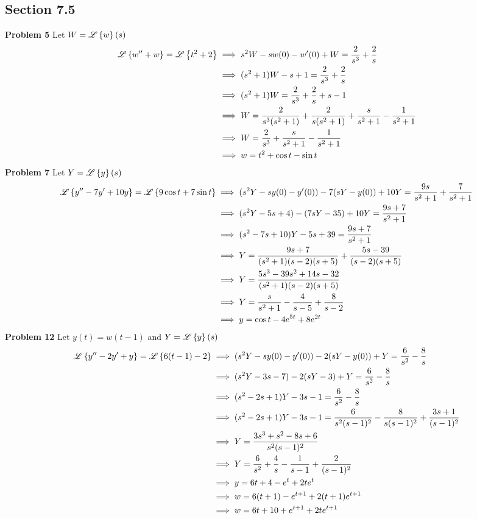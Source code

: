 \subsection*{Section 7.5}
\textbf{Problem 5}
Let $W = \mathscr{L} \left\{ w \right\}(s)$
\begin{align*}
    \mathscr{L} \left\{ w'' + w \right\} = \mathscr{L} \left\{ t^2+2 \right\}
    &\implies s^2W - sw(0) - w'(0) + W = \frac{2}{s^3} + \frac{2}{s} \\
    &\implies (s^2 + 1)W - s + 1 = \frac{2}{s^3} + \frac{2}{s} \\
    &\implies (s^2 + 1)W = \frac{2}{s^3} + \frac{2}{s} + s - 1 \\
    &\implies W = \frac{2}{s^3(s^2+1)} + \frac{2}{s(s^2+1)} + \frac{s}{s^2+1} - \frac{1}{s^2+1} \\
    &\implies W = \frac{2}{s^3} + \frac{s}{s^2+1} - \frac{1}{s^2+1} \\
    &\implies w = t^2 + \cos t - \sin t
\end{align*}
\textbf{Problem 7}
Let $Y = \mathscr{L} \left\{ y \right\}(s)$
\begin{align*}
    \mathscr{L} \left\{ y'' - 7y' + 10y \right\} = \mathscr{L} \left\{ 9\cos t + 7\sin t \right\}
    &\implies (s^2Y - sy(0) - y'(0))- 7 (sY - y(0)) + 10 Y = \frac{9s}{s^2+1} + \frac{7}{s^2+1} \\
    &\implies (s^2Y - 5s + 4) - (7sY - 35) + 10 Y = \frac{9s + 7}{s^2+1} \\
    &\implies (s^2-7s+10)Y -5s + 39 = \frac{9s + 7}{s^2+1} \\
    &\implies Y = \frac{9s + 7}{(s^2+1)(s-2)(s+5)} + \frac{5s-39}{(s-2)(s+5)} \\
    &\implies Y = \frac{5s^3-39s^2+14s-32}{(s^2+1)(s-2)(s+5)} \\
    &\implies Y =  \frac{s}{s^2+1} - \frac{4}{s-5} + \frac{8}{s-2} \\
    &\implies y = \cos t - 4e^{5t} + 8e^{2t}
\end{align*}
\textbf{Problem 12}
Let $y(t) = w(t-1)$ and $Y = \mathscr{L} \left\{ y \right\}(s)$
\begin{align*}
    \mathscr{L} \left\{ y'' -2y' + y \right\} = \mathscr{L} \left\{ 6(t-1)-2 \right\}
    &\implies (s^2Y - sy(0) - y'(0)) -2 (sY - y(0)) + Y = \frac{6}{s^2} - \frac{8}{s} \\
    &\implies (s^2Y - 3s - 7) -2 (sY - 3) + Y = \frac{6}{s^2} - \frac{8}{s} \\
    &\implies (s^2-2s+1)Y - 3s - 1 = \frac{6}{s^2} - \frac{8}{s} \\
    &\implies (s^2-2s+1)Y - 3s - 1 = \frac{6}{s^2(s-1)^2} - \frac{8}{s(s-1)^2} + \frac{3s+1}{(s-1)^2} \\
    &\implies Y = \frac{3s^3+s^2-8s+6}{s^2(s-1)^2} \\
    &\implies Y = \frac{6}{s^2} + \frac{4}{s} - \frac{1}{s-1} + \frac{2}{(s-1)^2} \\
    &\implies y = 6t+4 - e^t + 2te^t \\
    &\implies w = 6(t+1) - e^{t+1} + 2(t+1)e^{t+1} \\
    &\implies w = 6t + 10 + e^{t+1} + 2te^{t+1}
\end{align*}
